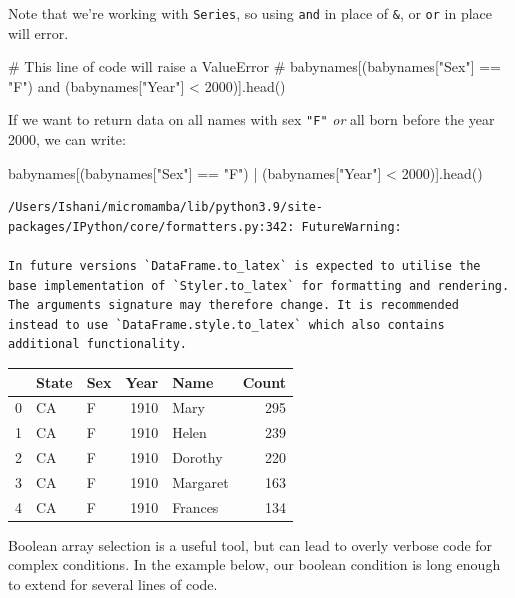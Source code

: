 \documentclass[
  letterpaper,
  DIV=11,
  numbers=noendperiod]{scrreprt}
\newenvironment{Shaded}{\begin{snugshade}}{\end{snugshade}}
\newcommand{\CommentTok}[1]{\textcolor[rgb]{0.37,0.37,0.37}{#1}}
\newcommand{\DecValTok}[1]{\textcolor[rgb]{0.68,0.00,0.00}{#1}}
\newcommand{\NormalTok}[1]{\textcolor[rgb]{0.00,0.23,0.31}{#1}}
\newcommand{\OperatorTok}[1]{\textcolor[rgb]{0.37,0.37,0.37}{#1}}
\newcommand{\StringTok}[1]{\textcolor[rgb]{0.13,0.47,0.30}{#1}}
\begin{document}
Note that we're working with \texttt{Series}, so using \texttt{and} in
place of \texttt{\&}, or \texttt{or} in place \texttt{\textbar{}} will
error.

\begin{Shaded}
\begin{Highlighting}[]
\CommentTok{\# This line of code will raise a ValueError}
\CommentTok{\# babynames[(babynames["Sex"] == "F") and (babynames["Year"] \textless{} 2000)].head()}
\end{Highlighting}
\end{Shaded}

If we want to return data on all names with sex \texttt{"F"} \emph{or}
all born before the year 2000, we can write:

\begin{Shaded}
\begin{Highlighting}[]
\NormalTok{babynames[(babynames[}\StringTok{"Sex"}\NormalTok{] }\OperatorTok{==} \StringTok{"F"}\NormalTok{) }\OperatorTok{|}\NormalTok{ (babynames[}\StringTok{"Year"}\NormalTok{] }\OperatorTok{\textless{}} \DecValTok{2000}\NormalTok{)].head()}
\end{Highlighting}
\end{Shaded}

\begin{verbatim}
/Users/Ishani/micromamba/lib/python3.9/site-packages/IPython/core/formatters.py:342: FutureWarning:

In future versions `DataFrame.to_latex` is expected to utilise the base implementation of `Styler.to_latex` for formatting and rendering. The arguments signature may therefore change. It is recommended instead to use `DataFrame.style.to_latex` which also contains additional functionality.
\end{verbatim}

\begin{tabular}{lllrlr}
\toprule
{} & State & Sex &  Year &      Name &  Count \\
\midrule
0 &    CA &   F &  1910 &      Mary &    295 \\
1 &    CA &   F &  1910 &     Helen &    239 \\
2 &    CA &   F &  1910 &   Dorothy &    220 \\
3 &    CA &   F &  1910 &  Margaret &    163 \\
4 &    CA &   F &  1910 &   Frances &    134 \\
\bottomrule
\end{tabular}

Boolean array selection is a useful tool, but can lead to overly verbose
code for complex conditions. In the example below, our boolean condition
is long enough to extend for several lines of code.
\end{document}

